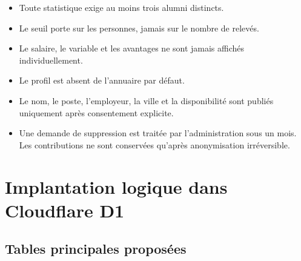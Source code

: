 \documentclass[11pt,a4paper]{article}
\begin{document}
\begin{itemize}
  \item Toute statistique exige au moins trois alumni distincts.
  \item Le seuil porte sur les personnes, jamais sur le nombre de relevés.
  \item Le salaire, le variable et les avantages ne sont jamais affichés
        individuellement.
  \item Le profil est absent de l'annuaire par défaut.
  \item Le nom, le poste, l'employeur, la ville et la disponibilité sont publiés
        uniquement après consentement explicite.
  \item Une demande de suppression est traitée par l'administration sous un
        mois. Les contributions ne sont conservées qu'après anonymisation
        irréversible.
\end{itemize}

\section{Implantation logique dans Cloudflare D1}

\subsection{Tables principales proposées}
\end{document}

